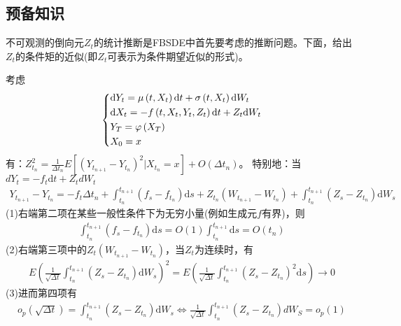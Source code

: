 	\subsection{预备知识}

		不可观测的倒向元$Z_t$的统计推断是FBSDE中首先要考虑的推断问题。下面，给出$Z_t$的条件矩的近似(即$Z_t$可表示为条件期望近似的形式)。
		\par
		考虑
		\begin{equation*}
			\centering
			\left\{\begin{lgathered}
			{\mathrm{d}{Y_t} = \mu \left( {t,{X_t}} \right)\mathrm{d}t + \sigma \left( {t,{X_t}} \right)\mathrm{d}{W_t}}\\
			{\mathrm{d}{X_t} =  - f\left( {t,{X_t},{Y_t},{Z_t}} \right)\mathrm{d}t + {Z_t}\mathrm{d}{W_t}}\\
			{{Y_T} = \varphi \left( {{X_T}} \right)}\\
			{X_0=x}
			\end{lgathered} \right.
		\end{equation*}
		有：$Z_{{t_n}}^2 = \frac{1}{{\Delta {t_n}}}E\left[ {{{\left( {{Y_{{t_{n + 1}}}} - {Y_{{t_n}}}} \right)}^2}|{X_{{t_n}}} = x} \right] + O\left( {\Delta {t_n}} \right)$。
		特别地：当$dY_t=-f_t\mathrm{d}t+Z_tdW_t$
		\begin{align*}
		{Y_{{t_{n + 1}}}} - {Y_{{t_n}}} =  - {f_t}\Delta {t_n} + \int_{{t_n}}^{{t_{n + 1}}} {\left( {{f_s} - {f_{{t_n}}}} \right)\mathrm{d}s + } {Z_{{t_n}}}\left( {{W_{{t_{n + 1}}}} - {W_{{t_n}}}} \right) + \int_{{t_n}}^{{t_{n + 1}}} {\left( {{Z_s} - {Z_{{t_n}}}} \right)\mathrm{d}{W_s}} \end{align*}
		(1)右端第二项在某些一般性条件下为无穷小量(例如生成元$f$有界)，则
		\begin{align*}
		\int_{{t_n}}^{{t_{n + 1}}} {\left( {{f_s} - {f_{{t_n}}}} \right)\mathrm{d}s = O\left( 1 \right)\int_{{t_n}}^{{t_{n + 1}}} {\mathrm{d}s}  = O\left( {{t_n}} \right) } \end{align*}
		(2)右端第三项中的$Z_t\left( {{W_{{t_{n + 1}}}} - {W_{{t_n}}}} \right)$，当$Z_t$为连续时，有
		\begin{align*}
		E{\left( {\frac{1}{{\sqrt {\Delta t} }}\int_{{t_n}}^{{t_{n + 1}}} {\left( {{Z_s} - {Z_{{t_n}}}} \right)\mathrm{d}{W_s}} } \right)^2} = E\left( {\frac{1}{{\sqrt {\Delta t} }}\int_{{t_n}}^{{t_{n + 1}}} {{{\left( {{Z_s} - {Z_{{t_n}}}} \right)}^2}\mathrm{d}s} } \right) \rightarrow 0\end{align*}
		(3)进而第四项有
		\begin{align*}
		{o_p}\left( {\sqrt {\Delta t} } \right) = \int_{{t_n}}^{{t_{n + 1}}} {\left( {{Z_s} - {Z_{{t_n}}}} \right)\mathrm{d}{W_s}} \Leftrightarrow \frac{1}{{\sqrt {\Delta t} }}\int_{{t_n}}^{{t_{n + 1}}} {\left( {{Z_s} - {Z_{{t_n}}}} \right)d{W_S}}  = {o_p}\left( 1 \right)\end{align*}
